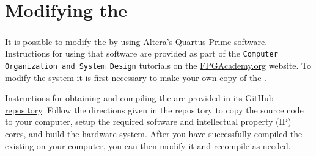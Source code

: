 \section{Modifying the \systemNameFull}

It is possible to modify the {\it \systemNameFull} 
by using Altera's Quartus\textsuperscript{\textregistered} Prime software. 
Instructions for using that software are
provided as part of the \texttt{Computer Organization and System Design} tutorials on the 
{\small \href{https://www.fpgacademy.org/tutorials.html} {FPGAcademy.org}} website.
To modify the system it is first necessary to make your own copy of the 
{\it \systemNameFull}. 

Instructions for obtaining and compiling the {\it \systemNameFull} are provided in its 
\href{https://github.com/fpgacademy/Design_Examples/tree/main/Computer_Systems}
{GitHub repository}. Follow the directions given in the repository to copy the source code
to your computer, setup the required software and intellectual property (IP) cores, and
build the hardware system. After you have successfully compiled the existing 
{\it \systemNameFull} on your computer, you can then modify it and recompile as needed.

